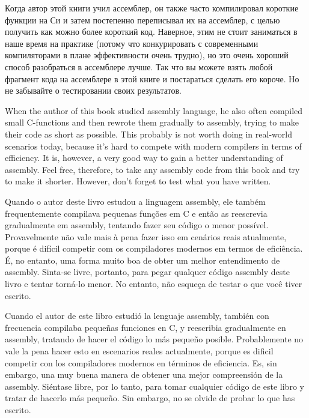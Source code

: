 \ifdefined\RUSSIAN
Когда автор этой книги учил ассемблер, он также часто компилировал короткие функции на Си и затем постепенно 
переписывал их на ассемблер, с целью получить как можно более короткий код.
Наверное, этим не стоит заниматься в наше время на практике (потому что конкурировать с современными
компиляторами в плане эффективности очень трудно), но это очень хороший способ разобраться в ассемблере
лучше.
Так что вы можете взять любой фрагмент кода на ассемблере в этой книге и постараться сделать его короче.
Но не забывайте о тестировании своих результатов.
\fi %

\ifdefined\ENGLISH
When the author of this book studied assembly language, he also often compiled small C-functions and then rewrote
them gradually to assembly, trying to make their code as short as possible.
This probably is not worth doing in real-world scenarios today, 
because it's hard to compete with modern compilers in terms of efficiency. It is, however, a very good way to gain a better understanding of assembly.
Feel free, therefore, to take any assembly code from this book and try to make it shorter.
However, don't forget to test what you have written.
\fi %

\ifdefined\BRAZILIAN
Quando o autor deste livro estudou a linguagem assembly, ele também frequentemente compilava pequenas funções em C e então as reescrevia gradualmente em assembly, tentando fazer seu código o menor possível.
Provavelmente não vale mais à pena fazer isso em cenários reais atualmente, 
porque é difícil competir com os compiladores modernos em termos de eficiência. É, no entanto, uma forma muito boa de obter um melhor entendimento de assembly.
Sinta-se livre, portanto, para pegar qualquer código assembly deste livro e tentar torná-lo menor.
No entanto, não esqueça de testar o que você tiver escrito.
\fi %

\ifdefined\SPANISH
Cuando el autor de este libro estudió la lenguaje assembly, también con frecuencia compilaba pequeñas funciones en C, y reescribia gradualmente en assembly, tratando de hacer el código lo más pequeño posible.
Probablemente no vale la pena hacer esto en escenarios reales actualmente, 
porque es dificil competir con los compiladores modernos en términos de eficiencia. Es, sin embargo, una muy buena manera de obtener una mejor compreensión de la assembly.
Siéntase libre, por lo tanto, para tomar cualquier código de este libro y tratar de hacerlo más pequeño.
Sin embargo, no se olvide de probar lo que has escrito.
\fi %

